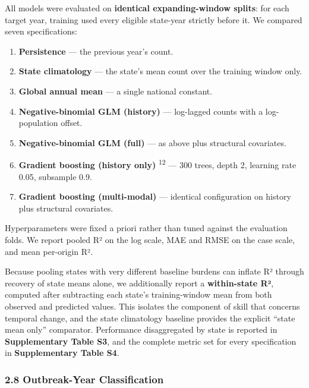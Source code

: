 \documentclass[
  10pt,
  twocolumn]{article}
\providecommand{\tightlist}{%
  \setlength{\itemsep}{0pt}\setlength{\parskip}{0pt}}
\begin{document}
All models were evaluated on \textbf{identical expanding-window splits}:
for each target year, training used every eligible state-year strictly
before it. We compared seven specifications:

\begin{enumerate}
\def\labelenumi{\arabic{enumi}.}
\tightlist
\item
  \textbf{Persistence} --- the previous year's count.
\item
  \textbf{State climatology} --- the state's mean count over the
  training window only.
\item
  \textbf{Global annual mean} --- a single national constant.
\item
  \textbf{Negative-binomial GLM (history)} --- log-lagged counts with a
  log-population offset.
\item
  \textbf{Negative-binomial GLM (full)} --- as above plus structural
  covariates.
\item
  \textbf{Gradient boosting (history only)} \textsuperscript{12} --- 300
  trees, depth 2, learning rate 0.05, subsample 0.9.
\item
  \textbf{Gradient boosting (multi-modal)} --- identical configuration
  on history plus structural covariates.
\end{enumerate}

Hyperparameters were fixed a priori rather than tuned against the
evaluation folds. We report pooled R² on the log scale, MAE and RMSE on
the case scale, and mean per-origin R².

Because pooling states with very different baseline burdens can inflate
R² through recovery of state means alone, we additionally report a
\textbf{within-state R²}, computed after subtracting each state's
training-window mean from both observed and predicted values. This
isolates the component of skill that concerns temporal change, and the
state climatology baseline provides the explicit ``state mean only''
comparator. Performance disaggregated by state is reported in
\textbf{Supplementary Table S3}, and the complete metric set for every
specification in \textbf{Supplementary Table S4}.

\subsubsection{2.8 Outbreak-Year
Classification}\label{outbreak-year-classification}
\end{document}
